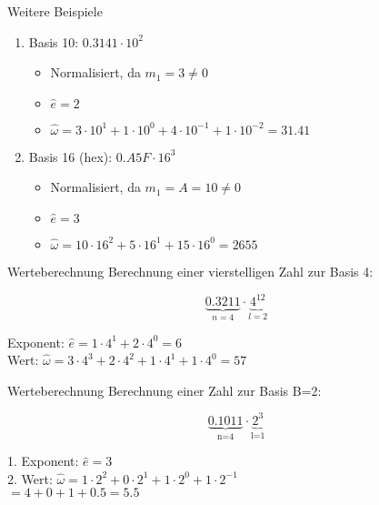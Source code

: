 \begin{example2}{Weitere Beispiele}
\begin{enumerate}
    \item Basis 10: $0.3141 \cdot 10^2$
    \begin{itemize}
        \item Normalisiert, da $m_1 = 3 \neq 0$
        \item $\hat{e} = 2$
        \item $\hat{\omega} = 3 \cdot 10^1 + 1 \cdot 10^0 + 4 \cdot 10^{-1} + 1 \cdot 10^{-2} = 31.41$
    \end{itemize}
    
    \item Basis 16 (hex): $0.A5F \cdot 16^3$
    \begin{itemize}
        \item Normalisiert, da $m_1 = A = 10 \neq 0$
        \item $\hat{e} = 3$
        \item $\hat{\omega} = 10 \cdot 16^2 + 5 \cdot 16^1 + 15 \cdot 16^0 = 2655$
    \end{itemize}
\end{enumerate}
\end{example2}

\begin{example2}{Werteberechnung} Berechnung einer vierstelligen Zahl zur Basis 4:
    \vspace{-2mm}\\
    \begin{minipage}{0.3\textwidth}
        $$\underbrace{0.3211}_{n=4} \cdot \underbrace{4^{12}}_{l=2}$$
    \end{minipage}
    \begin{minipage}[t]{0.65\textwidth}
        Exponent: $\hat{e} = 1 \cdot 4^1 + 2 \cdot 4^0 = 6$ \vspace{1mm}\\
        Wert: $\hat{\omega} = 3 \cdot 4^3 + 2 \cdot 4^2 + 1 \cdot 4^1 + 1 \cdot 4^0 = 57$
    \end{minipage}
\end{example2}

\begin{example2}{Werteberechnung} Berechnung einer Zahl zur Basis B=2:
\begin{minipage}{0.45\textwidth}
    $$\underbrace{0.1011}_{\text{n=4}} \cdot \underbrace{2^{3}}_{\text{l=1}}$$
\end{minipage}
\begin{minipage}[t]{0.5\textwidth}
    1. Exponent: $\hat{e} = 3$ \\ 
    2. Wert: $\hat{\omega} = 1\cdot2^2 + 0\cdot2^1 + 1\cdot2^0 + 1\cdot2^{-1}$ \\
    $= 4 + 0 + 1 + 0.5 = 5.5$
\end{minipage}
\end{example2}


